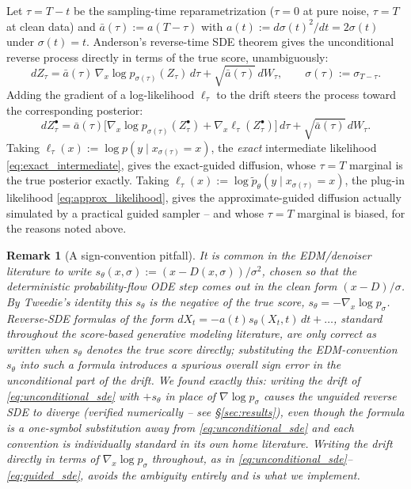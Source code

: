 \documentclass[english,10pt]{article}
\numberwithin{equation}{section}
\newtheorem{remark}{Remark}[section]
\begin{document}
Let $\tau=T-t$ be the sampling-time reparametrization ($\tau=0$ at pure noise,
$\tau=T$ at clean data) and $\bar a(\tau):=a(T-\tau)$ with
$a(t):=d\sigma(t)^2/dt=2\sigma(t)$ under $\sigma(t)=t$. Anderson's reverse-time
SDE theorem \citep{anderson1982reverse,song2021score} gives the unconditional
reverse process directly in terms of the true score, unambiguously:
\begin{equation}
dZ_\tau = \bar a(\tau)\,\nabla_x\log p_{\sigma(\tau)}(Z_\tau)\,d\tau + \sqrt{\bar a(\tau)}\,dW_\tau,
\qquad \sigma(\tau):=\sigma_{T-\tau}.
\label{eq:unconditional_sde}
\end{equation}
Adding the gradient of a log-likelihood $\ell_\tau$ to the drift steers the
process toward the corresponding posterior:
\begin{equation}
dZ_\tau^\bullet = \bar a(\tau)\Big[\nabla_x\log p_{\sigma(\tau)}(Z_\tau^\bullet) + \nabla_x \ell_\tau(Z_\tau^\bullet)\Big]\,d\tau + \sqrt{\bar a(\tau)}\,dW_\tau.
\label{eq:guided_sde}
\end{equation}
Taking $\ell_\tau(x) := \log p(y\mid x_{\sigma(\tau)}=x)$, the \emph{exact}
intermediate likelihood \eqref{eq:exact_intermediate}, gives the exact-guided
diffusion, whose $\tau=T$ marginal is the true posterior exactly. Taking
$\ell_\tau(x):=\log\tilde p_\theta(y\mid x_{\sigma(\tau)}=x)$, the plug-in
likelihood \eqref{eq:approx_likelihood}, gives the approximate-guided
diffusion actually simulated by a practical guided sampler -- and whose
$\tau=T$ marginal is biased, for the reasons noted above.

\begin{remark}[A sign-convention pitfall]
\label{rem:sign}
It is common in the EDM/denoiser literature \citep{karras2022elucidating} to
write $s_\theta(x,\sigma):=(x-D(x,\sigma))/\sigma^2$, chosen so that the
deterministic probability-flow ODE step comes out in the clean form
$(x-D)/\sigma$. By Tweedie's identity this $s_\theta$ is the \emph{negative}
of the true score, $s_\theta=-\nabla_x\log p_\sigma$. Reverse-SDE formulas of
the form $dX_t=-a(t)s_\theta(X_t,t)\,dt+\ldots$, standard throughout the
score-based generative modeling literature, are only correct as written when
$s_\theta$ denotes the true score directly; substituting the EDM-convention
$s_\theta$ into such a formula introduces a spurious overall sign error in the
unconditional part of the drift. We found exactly this: writing the drift of
\eqref{eq:unconditional_sde} with $+s_\theta$ in place of $\nabla\log p_\sigma$
causes the unguided reverse SDE to diverge (verified numerically -- see
\S\ref{sec:results}), even though the formula is a one-symbol substitution
away from \eqref{eq:unconditional_sde} and each convention is individually
standard in its own home literature. Writing the drift directly in terms of
$\nabla_x\log p_\sigma$ throughout, as in \eqref{eq:unconditional_sde}--\eqref{eq:guided_sde},
avoids the ambiguity entirely and is what we implement.
\end{remark}
\end{document}

